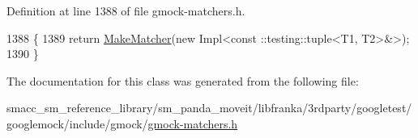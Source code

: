 Definition at line 1388 of file gmock-\/matchers.\+h.


\begin{DoxyCode}
1388                                                         \{
1389     \textcolor{keywordflow}{return} \hyperlink{namespacetesting_a37fd8029ac00e60952440a3d9cca8166}{MakeMatcher}(\textcolor{keyword}{new} Impl<const ::testing::tuple<T1, T2>&>);
1390   \}
\end{DoxyCode}


The documentation for this class was generated from the following file\+:\begin{DoxyCompactItemize}
\item 
smacc\+\_\+sm\+\_\+reference\+\_\+library/sm\+\_\+panda\+\_\+moveit/libfranka/3rdparty/googletest/googlemock/include/gmock/\hyperlink{gmock-matchers_8h}{gmock-\/matchers.\+h}\end{DoxyCompactItemize}
